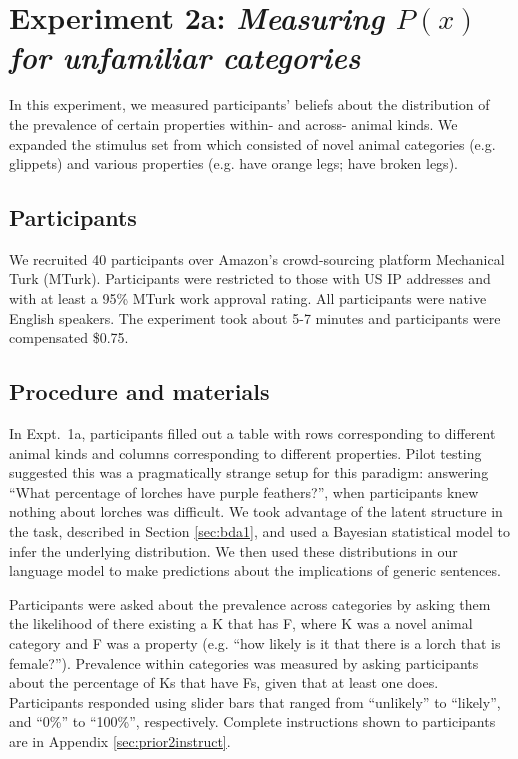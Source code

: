 \documentclass[10pt,letterpaper]{article}
\begin{document}
\section{Experiment 2a: \emph{Measuring $P(x)$ for unfamiliar categories}}

In this experiment, we measured participants' beliefs about the distribution of the prevalence of certain properties within- and across- animal kinds. 
We expanded the stimulus set from  which consisted of novel animal categories (e.g. glippets) and various properties (e.g. have orange legs; have broken legs).


\subsection{Participants}

We recruited 40 participants over Amazon's crowd-sourcing platform Mechanical Turk (MTurk).  Participants were restricted to those with US IP addresses and with at least a 95\% MTurk work approval rating. All participants were native English speakers. The experiment took about 5-7 minutes and participants were compensated \$0.75.

\subsection{Procedure and materials}

In Expt.~1a, participants filled out a table with rows corresponding to different animal kinds and columns corresponding to different properties. 
Pilot testing suggested this was a pragmatically strange setup for this paradigm: answering ``What percentage of lorches have purple feathers?'', when participants knew nothing about lorches was difficult.
We took advantage of the latent structure in the task, described in Section \ref{sec:bda1}, and used a Bayesian statistical model to infer the underlying distribution. 
We then used these distributions in our language model to make predictions about the implications of generic sentences.

Participants were asked about the prevalence across categories by asking them the likelihood of there existing a K that has F, where K was a novel animal category and F was a property (e.g. ``how likely is it that there is a lorch that is female?''). 
Prevalence within categories was measured by asking participants about the percentage of Ks that have Fs, given that at least one does.
Participants responded using slider bars that ranged from ``unlikely'' to ``likely'', and ``0\%'' to ``100\%'', respectively.
Complete instructions shown to participants are in Appendix \ref{sec:prior2instruct}. 
\end{document}
